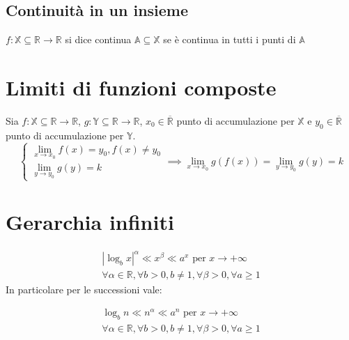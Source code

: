 \subsection{Continuità in un insieme}
$f:\mathbb{X} \subseteq \mathbb{R} \to \mathbb{R}$ si dice continua $\mathbb{A} \subseteq \mathbb{X}$ se è continua in tutti i punti di $\mathbb{A}$
\section{Limiti di funzioni composte}
Sia $f: \mathbb{X} \subseteq \mathbb{R} \to \mathbb{R}$, $g: \mathbb{Y} \subseteq \mathbb{R} \to \mathbb{R}$, $x_0 \in \overline{\mathbb{R}}$ punto di accumulazione per $\mathbb{X}$ e $y_0 \in \overline{\mathbb{R}}$ punto di accumulazione per $\mathbb{Y}$.
\begin{equation}
\begin{cases}
\displaystyle\lim_{x \to x_0}f(x)=y_0, f(x) \neq y_0\\
\displaystyle \lim_{y \to y_0} g(y)=k
\end{cases}
\implies \displaystyle\lim_{x \to x_0} g(f(x)) = \displaystyle\lim_{y \to y_0} g(y)=k
\end{equation}

\section{Gerarchia infiniti}
\begin{equation}
\begin{split}
|\log_b x|^{\alpha} \ll x^{\beta} \ll a^{x} \text{ per } x \to +\infty\\
\forall \alpha \in \mathbb{R}, \forall b>0, b \neq 1, \forall \beta >0, \forall a \ge 1
\end{split}
\end{equation}
In particolare per le successioni vale:

\begin{equation}
\begin{split}
\log_b n \ll n^{\alpha} \ll a^{n} \text{ per } x \to +\infty\\
\forall \alpha \in \mathbb{R}, \forall b>0, b \neq 1, \forall \beta > 0, \forall a \ge 1
\end{split}
\end{equation}


